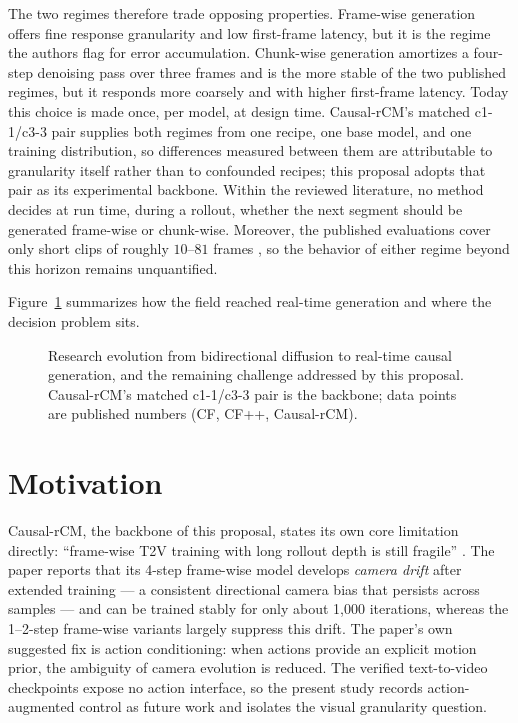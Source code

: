\documentclass[11pt,a4paper]{article}
\begin{document}
The two regimes therefore trade opposing properties. Frame-wise generation offers fine response granularity and low first-frame latency, but it is the regime the authors flag for error accumulation. Chunk-wise generation amortizes a four-step denoising pass over three frames and is the more stable of the two published regimes, but it responds more coarsely and with higher first-frame latency. Today this choice is made once, per model, at design time. Causal-rCM's matched c1-1/c3-3 pair supplies both regimes from one recipe, one base model, and one training distribution, so differences measured between them are attributable to granularity itself rather than to confounded recipes; this proposal adopts that pair as its experimental backbone. Within the reviewed literature, no method decides at run time, during a rollout, whether the next segment should be generated frame-wise or chunk-wise. Moreover, the published evaluations cover only short clips of roughly $10$--$81$ frames \parencite{zhuCausalForcingAutoregressive2026a,zhaoCausalForcingScalable2026a,zhaoMinWMFullStackOpenSource2026a}, so the behavior of either regime beyond this horizon remains unquantified.

Figure~\ref{fig:evolution} summarizes how the field reached real-time generation and where the decision problem sits.

\begin{figure}[t]
\centering

\caption{Research evolution from bidirectional diffusion to real-time causal generation, and the remaining challenge addressed by this proposal. Causal-rCM's matched c1-1/c3-3 pair is the backbone; data points are published numbers (CF, CF++, Causal-rCM).}
\label{fig:evolution}
\end{figure}

\section{Motivation}\label{sec:motivation}

Causal-rCM, the backbone of this proposal, states its own core limitation directly: ``frame-wise T2V training with long rollout depth is still fragile'' \parencite{zhengCausalrCMUnifiedTeacherForcing2026}. The paper reports that its 4-step frame-wise model develops \emph{camera drift} after extended training --- a consistent directional camera bias that persists across samples --- and can be trained stably for only about 1{,}000 iterations, whereas the 1--2-step frame-wise variants largely suppress this drift. The paper's own suggested fix is action conditioning: when actions provide an explicit motion prior, the ambiguity of camera evolution is reduced. The verified text-to-video checkpoints expose no action interface, so the present study records action-augmented control as future work and isolates the visual granularity question.
\end{document}
